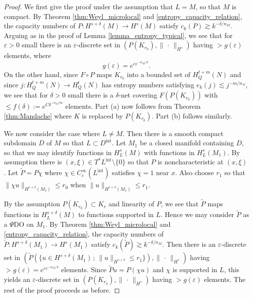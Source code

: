 \documentclass[12pt,twoside]{amsart}
\numberwithin{equation}{section}
\renewcommand{\leq}{\leqslant}
\newcommand{\norm}[1]{\lVert #1 \rVert}         %
\newcommand{\eps}{\varepsilon}
\begin{document}
\begin{proof}
We first give the proof under the assumption that $L = M$, so that $M$ is compact. By Theorem \ref{thm:Weyl_microlocal} and \eqref{entropy_capacity_relation}, the capacity numbers of $P: H^{s+\delta}(M) \to H^s(M)$ satisfy $c_k(P) \gtrsim k^{-\delta/n_M}$. Arguing as in the proof of Lemma \ref{lemma_entropy_typical}, we see that for $\eps > 0$ small there is an $\eps$-discrete set in $(P(K_{r_0}), \norm{\,\cdot\,}_{H^s})$ having $> g(\eps)$ elements, where 
\[
g(\eps) = e^{c \eps^{-n_M/\delta}}.
\]
On the other hand, since $F \circ P$ maps $K_{r_0}$ into a bounded set of $H^{t+m}_Q(N)$ and since $j: H^{t+m}_Q(N) \to H^t_Q(N)$ has entropy numbers satisfying $e_k(j) \lesssim j^{-m/n_N}$, we see that for $\delta > 0$ small there is a $\delta$-net covering $F(P(K_{r_0}))$ with $\leq f(\delta) := e^{C \delta^{-n_N/m}}$ elements. Part (a) now follows from Theorem \ref{thm:Mandache} where $K$ is replaced by $P(K_{r_0})$. Part (b) follows similarly.


We now consider the case where $L \neq M$. Then there is a smooth compact subdomain $D$ of $M$ so that $L \subset D^{\mathrm{int}}$. Let $M_1$ be a closed manifold containing $D$, so that we may identify functions in $H^s_L(M)$ with functions in $H^s_L(M_1)$. By assumption there is $(x,\xi) \in T^* L^{\mathrm{int}} \setminus \{0\}$ so that $P$ is noncharacteristic at $(x,\xi)$. Let $\tilde{P} = P \chi$ where $\chi \in C^{\infty}_c(L^{\mathrm{int}})$ satisfies $\chi = 1$ near $x$. Also choose $r_1$ so that $\norm{\chi u}_{H^{s+\delta}(M_1)} \leq r_0$ when $\norm{u}_{H^{s+\delta}(M_1)} \leq r_1$. 

By the assumption $P(K_{r_0}) \subset K_r$ and linearity of $P$, we see that $\tilde{P}$ maps functions in $H^{s+\delta}_L(M)$ to functions supported in $L$. Hence we may consider $\tilde{P}$ as a $\Psi$DO on $M_1$. By Theorem \ref{thm:Weyl_microlocal} and \eqref{entropy_capacity_relation}, the capacity numbers of $\tilde{P}: H^{s+\delta}(M_1) \to H^s(M_1)$ satisfy $c_k(\tilde{P}) \gtrsim k^{-\delta/n_M}$. Then there is an $\eps$-discrete set in $(\tilde{P}(\{ u \in H^{s+\delta}(M_1) \,;\, \norm{u}_{H^{s+\delta}} \leq r_1 \}), \norm{\,\cdot\,}_{H^s})$ having $> g(\eps)= e^{c \eps^{-n_M/\delta}}$ elements. Since $\tilde{P}u = P(\chi u)$ and $\chi$ is supported in $L$, this yields an $\eps$-discrete set in $(P(K_{r_0}), \norm{\,\cdot\,}_{H^s})$ having $> g(\eps)$ elements. The rest of the proof proceeds as before.
\end{proof}
\end{document}

